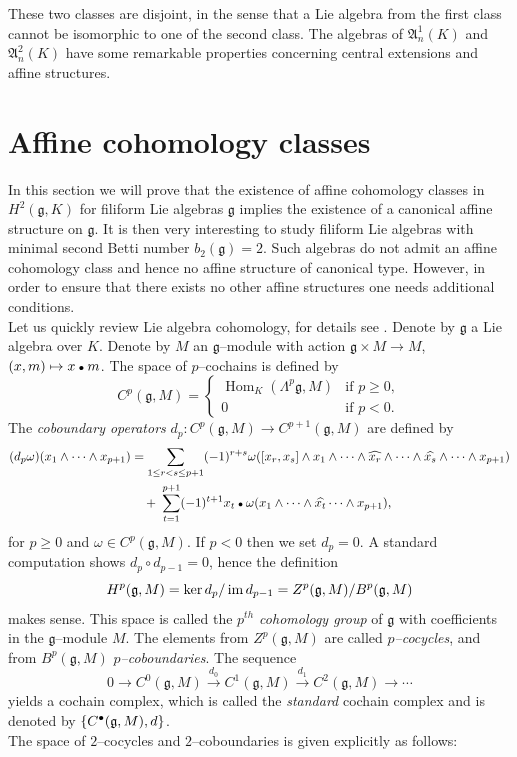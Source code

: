 \documentclass[12pt]{amsart}
\theoremstyle{definition}
\theoremstyle{remark}
\DeclareMathOperator{\Hom}{Hom}
\newcommand{\pkt}{\mathbin{\raise0pt\hbox{$\scriptstyle\bullet$}}}
\newcommand{\Lg}{\mathfrak{g}}
\newcommand{\LA}{\mathfrak{A}}
\newcommand{\im}{\mathop{\rm im}}
\newcommand{\om}{\omega}
\begin{document}
These two classes are disjoint, in the sense that a
Lie algebra from the first class cannot be isomorphic to one of the
second class.
The algebras of $\LA_n^1(K)$ and $\LA_n^2(K)$ have some remarkable
properties concerning central extensions and affine structures.  



\section{Affine cohomology classes}

In this section we will prove that the existence of
affine cohomology classes in $H^2(\Lg,K)$ for filiform Lie algebras $\Lg$
implies the existence of a canonical affine structure on $\Lg$.
It is then very interesting to study filiform Lie algebras with
minimal second Betti number $b_2(\Lg)=2$.
Such algebras do not admit an affine cohomology
class and hence no affine structure of canonical type. However,
in order to ensure that there exists no other affine structures
one needs additional conditions.\\[0.2cm]
Let us quickly review Lie algebra cohomology, for details see \cite{KNA}.
Denote by $\Lg$ a Lie algebra over $K$.
Denote by $M$ an $\Lg$--module with action $\Lg \times M \rightarrow M$,
$(x,m)\mapsto x \pkt m$.
The space of $p$--cochains is defined by
\begin{equation*}
C^p(\Lg,M)=\begin{cases}
\Hom_K(\Lambda^p\Lg,M) & \text{if $p\ge0$},\\
0 & \text{if $p<0$}.
\end{cases}
\end{equation*}
The {\it coboundary operators} $d_p: C^p(\Lg,M) \rightarrow C^{p+1}(\Lg,M)$
are defined by
\begin{equation*}\label{xx}
\begin{split}
(d_p\om)(x_1\wedge \dots \wedge x_{p+1}) & = \sum_{1\le r<s\le p+1}
(-1)^{r+s}\om ([x_r,x_s]\wedge x_1\wedge \dots \wedge \widehat{x_r}\wedge
\dots \wedge \widehat{x_s}\wedge \dots \wedge x_{p+1})\\
& \quad + \; \sum_{t=1}^{p+1} (-1)^{t+1}x_t \pkt \om (x_1\wedge \dots \wedge
\widehat{x_t}\dots \wedge x_{p+1}),
\end{split}
\end{equation*}
for $p\ge 0$ and $\om \in C^p(\Lg,M)$. If $p<0$ then we set $d_p=0$.
A standard computation shows $d_p\circ d_{p-1}=0$, hence the definition
$$ H^p(\Lg,M)=\ker d_p /\im d_{p-1}=Z^p(\Lg,M)/B^p(\Lg,M) $$
makes sense. This space is called the {\it $p^{th}$ cohomology group}
of $\Lg$ with coefficients in the $\Lg$--module $M$. The elements from
$Z^p(\Lg,M)$ are called {\it $p$--cocycles}, and from $B^p(\Lg,M)$
{\it $p$--coboundaries}.
The sequence
\begin{equation*}
0 \rightarrow C^0(\Lg,M) \xrightarrow{d_0} C^1(\Lg,M) \xrightarrow{d_1}
C^2(\Lg,M) \rightarrow \cdots
\end{equation*}
yields a cochain complex, which is called the {\it standard} cochain complex
and is denoted by $\{ C^{\pkt}(\Lg,M),d \}$.\\
The space of $2$--cocycles and $2$--coboundaries is given explicitly as follows:
\end{document}
